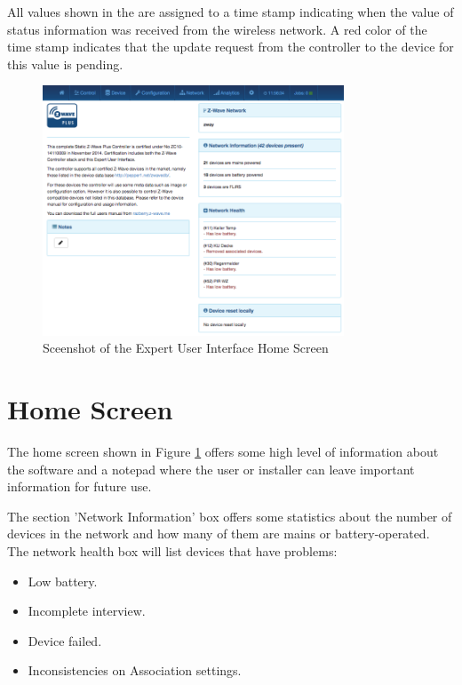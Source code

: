 All values shown in the \zweui are assigned to a time stamp indicating when 
the value of status information was received from the wireless network. A red color 
of the time stamp indicates that the update request from the controller to the device 
for this value is pending.

\begin{figure}
\begin{center}
\includegraphics[width=0.8\textwidth]{pngs/cap7/eui1.png}
\caption{Sceenshot of the Expert User Interface Home Screen}
\label{eui1}
\end{center}
\end{figure}


\section{Home Screen}

The home screen shown in Figure \ref{eui1} offers some high level of information about 
the software and a notepad where the user or installer can leave important information 
for future use.

The section 'Network Information' box offers some statistics about the number of devices in 
the network and how many of them are mains or battery-operated. The network health box 
will list devices that have problems:

\begin{itemize}
\item Low battery.
\item Incomplete interview.
\item Device failed.
\item Inconsistencies on Association settings.
\end{itemize}

